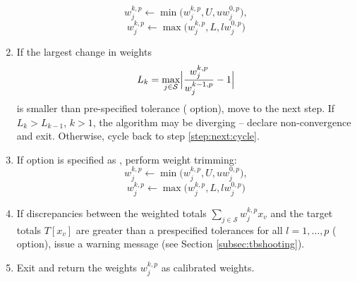 \begin{enumerate}
        $$
            w_j^{k,p} \leftarrow \min\bigl( w_j^{k,p}, U, u w_j^{0,p} \bigr),
        $$
        $$
            w_j^{k,p} \leftarrow \max\bigl( w_j^{k,p}, L, l w_j^{0,p} \bigr)
        $$
        \label{step:trimfreq:sometimes}
    \item If the largest change in weights 
        $$
            L_k = \max_{j \in \mathcal{S}} 
                \Bigl| \frac{w_j^{k,p}}{w_j^{k-1,p}} - 1 \Bigr|
        $$
        is smaller than pre-specified tolerance ( option),
        move to the next step. If $L_k > L_{k-1}$, $k>1$, the algorithm
        may be diverging -- declare non-convergence and exit.
        Otherwise, cycle back to step
        \ref{step:next:cycle}.
        \label{step:check:weight:conv}
    \item If  option is specified as ,
        perform weight trimming:
        $$
            w_j^{k,p} \leftarrow \min\bigl( w_j^{k,p}, U, u w_j^{0,p} \bigr),
        $$
        $$
            w_j^{k,p} \leftarrow \max\bigl( w_j^{k,p}, L, l w_j^{0,p} \bigr)
        $$
        \label{step:trimfreq:once}
    \item If discrepancies between the weighted totals 
        $\sum_{j \in \mathcal{S}} w_j^{k,p} x_v$
        and the target totals $T[x_v]$ are greater than
        a prespecified tolerances for all
        $l=1,\ldots,p$ ( option), 
        issue a warning message (see Section \ref{subsec:tbshooting}). 
        \label{step:check:ctotal:conv}   
    \item Exit and return the weights      $w_j^{k,p}$ as calibrated weights.
\end{enumerate}

